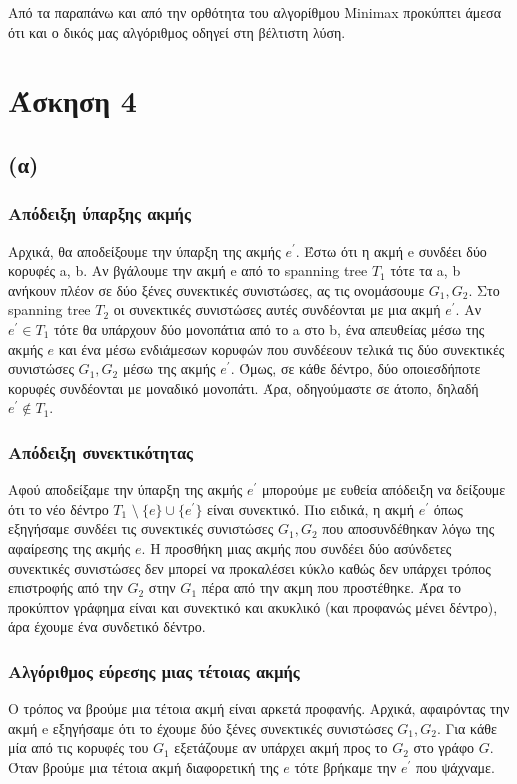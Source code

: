 \documentclass[a4paper,oneside, 11pt]{article}
\begin{document}
Από τα παραπάνω και από την ορθότητα του αλγορίθμου Minimax προκύπτει άμεσα ότι και ο δικός μας αλγόριθμος οδηγεί στη βέλτιστη λύση.
\section{Άσκηση 4}
\subsection{(α)}
\subsubsection{Απόδειξη ύπαρξης ακμής}
Αρχικά, θα αποδείξουμε την ύπαρξη της ακμής $e^{'}$. Έστω ότι η ακμή e συνδέει δύο κορυφές a, b. Αν βγάλουμε την ακμή e από το spanning tree $T_1$ τότε τα a, b ανήκουν πλέον σε δύο ξένες συνεκτικές συνιστώσες, ας τις ονομάσουμε $G_1, G_2$. Στο spanning tree $T_2$ οι συνεκτικές συνιστώσες αυτές συνδέονται με μια ακμή $e^{'}$. Αν $e^{'} \in T_1$ τότε θα υπάρχουν δύο μονοπάτια από το a στο b, ένα απευθείας μέσω της ακμής $e$ και ένα μέσω ενδιάμεσων κορυφών που συνδέεουν τελικά τις δύο συνεκτικές συνιστώσες $G_1, G_2$ μέσω της ακμής $e^{'}$. Όμως, σε κάθε δέντρο, δύο οποιεσδήποτε κορυφές συνδέονται με μοναδικό μονοπάτι. Άρα, οδηγούμαστε σε άτοπο, δηλαδή $e^{'}\not \in T_1$.  \bigbreak 

\subsubsection{Απόδειξη συνεκτικότητας}
Αφού αποδείξαμε την ύπαρξη της ακμής $e^{'}$ μπορούμε με ευθεία απόδειξη να δείξουμε ότι το νέο δέντρο $T_1 \textrm{ \textbackslash  }\  \{e\} \cup \{ e^{'}\}$ είναι συνεκτικό. Πιο ειδικά, η ακμή $e^{'}$ όπως εξηγήσαμε συνδέει τις συνεκτικές συνιστώσες $G_1, G_2$ που αποσυνδέθηκαν λόγω της αφαίρεσης της ακμής $e$. Η προσθήκη μιας ακμής που συνδέει δύο ασύνδετες συνεκτικές συνιστώσες δεν μπορεί να προκαλέσει κύκλο καθώς δεν υπάρχει τρόπος επιστροφής από την $G_2$ στην $G_1$ πέρα από την ακμη που προστέθηκε. Άρα το προκύπτον γράφημα είναι και συνεκτικό και ακυκλικό (και προφανώς μένει δέντρο), άρα έχουμε ένα συνδετικό δέντρο.
\subsubsection{Αλγόριθμος εύρεσης μιας τέτοιας ακμής}
Ο τρόπος να βρούμε μια τέτοια ακμή είναι αρκετά προφανής. Αρχικά, αφαιρόντας την ακμή e εξηγήσαμε ότι το έχουμε δύο ξένες συνεκτικές συνιστώσες $G_1, G_2$. Για κάθε μία από τις κορυφές του $G_1$ εξετάζουμε αν υπάρχει ακμή προς το $G_2$ στο γράφο $G$. Όταν βρούμε μια τέτοια ακμή διαφορετική της $e$ τότε βρήκαμε την $e^{'}$ που ψάχναμε. 
\end{document}

